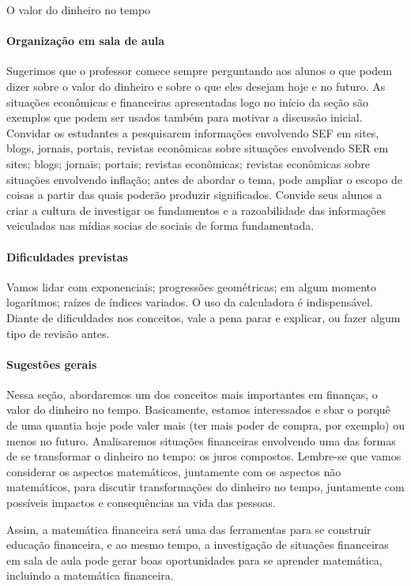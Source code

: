 \begin{paginatexto}{O valor do dinheiro no tempo}
\paragraph{Organização em sala de aula} Sugerimos que o professor comece sempre perguntando aos alunos o que podem dizer sobre o valor do dinheiro e sobre o que eles desejam hoje e no futuro. As situações econômicas e financeiras apresentadas logo no início da seção são exemplos que podem ser usados também para motivar a discussão inicial. Convidar os estudantes a pesquisarem informações envolvendo SEF em sites, blogs, jornais, portais, revistas econômicas sobre situações envolvendo SER em sites; blogs; jornais; portais; revistas econômicas; revistas econômicas sobre situações envolvendo inflação; antes de abordar o tema, pode ampliar o escopo de coisas a partir das quais poderão produzir significados. Convide seus alunos a criar a cultura de investigar os fundamentos e a razoabilidade das informações veiculadas nas mídias socias de sociais de forma fundamentada.

\paragraph{Dificuldades previstas} Vamos lidar com exponenciais; progressões geométricas; em algum momento logarítmos; raízes de índices variados. O uso da calculadora é indispensável. Diante de dificuldades nos conceitos, vale a pena parar e explicar, ou fazer algum tipo de revisão antes.

\paragraph{Sugestões gerais} Nessa seção, abordaremos um dos conceitos mais importantes em finanças, o valor do dinheiro no tempo. Basicamente, estamos interessados e sbar o porquê de uma quantia hoje pode valer mais (ter mais poder de compra, por exemplo) ou menos no futuro. Analisaremos situações financeiras envolvendo uma das formas de se transformar o dinheiro no tempo: os juros compostos. Lembre-se que vamos considerar os aspectos matemáticos, juntamente com os aspectos não matemáticos, para discutir transformações do dinheiro no tempo, juntamente com possíveis impactos e consequências na vida das pessoas.

Assim, a matemática financeira será uma das ferramentas para se construir educação financeira, e ao mesmo tempo, a investigação de situações financeiras em sala de aula pode gerar boas oportunidades para se aprender matemática, incluindo a matemática financeira.


\end{paginatexto}
